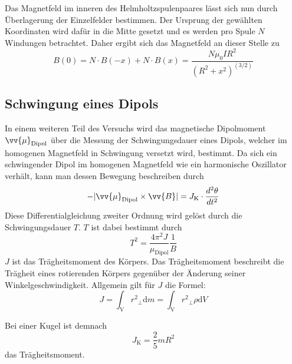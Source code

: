 Das Magnetfeld im inneren des Helmholtzspulenpaares lässt sich nun durch Überlagerung der Einzelfelder bestimmen. Der Ursprung der gewählten Koordinaten wird dafür in die Mitte 
gesetzt und es werden pro Spule $N$ Windungen betrachtet. Daher ergibt sich das Magnetfeld an dieser Stelle zu
\begin{equation}
    \label{eqn:Helmholtz_B}
    B(0) = N\cdot B(-x) +N\cdot B(x) = \frac{N\mu_0 IR^2}{\left(R^2 + x^2 \right)^{(3/2)}}
\end{equation}

\subsection{Schwingung eines Dipols}
\label{subsec:Schwingung}
In einem weiteren Teil des Versuchs wird das magnetische Dipolmoment $\vv{\mu}_{\text{Dipol}}$ über die Messung der Schwingungsdauer eines Dipols, welcher im homogenen Magnetfeld
in Schwingung versetzt wird, bestimmt. Da sich ein schwingender Dipol im homogenen Magnetfeld wie ein harmonische Oszillator verhält, kann man dessen Bewegung beschreiben durch
\begin{equation*}
    \label{eqn:BewegungsgleichungKugel}
    -\lvert \vv{\mu}_{\text{Dipol}} \times \vv{B}\rvert = J_{\text{K}} \cdot \frac{d^2 \theta}{dt^2}
\end{equation*}
Diese Differentialgleichung zweiter Ordnung wird gelöst durch die Schwingungsdauer $T$. $T$ ist dabei bestimmt durch
\begin{equation}
    \label{eqn:Schwingungsdauer}
    T^2 = \frac{4{\pi}^2 J}{{\mu}_{\text{Dipol}}}\frac{1}{B}
\end{equation} 
$J$ ist das Trägheitsmoment des Körpers. Das Trägheitsmoment beschreibt die Trägheit eines rotierenden Körpers gegenüber der Änderung seiner Winkelgeschwindigkeit.
Allgemein gilt für $J$ die Formel:
\begin{equation*}
    \label{eqn:Trägheitsmoment}
    J = \int_{\text{V}} {r^2}_{\bot} \text{d}m = \int_{\text{V}} {r^2}_{\bot} \rho \text{d}V
\end{equation*} 
\cite{Demtröder_Exp_P_1}

Bei einer Kugel ist demnach
\begin{equation}
    \label{eqn:Trägheitsmoment_Kugel}
    J_{\text{K}} = \frac{2}{5} m R^2
\end{equation}
das Trägheitsmoment.